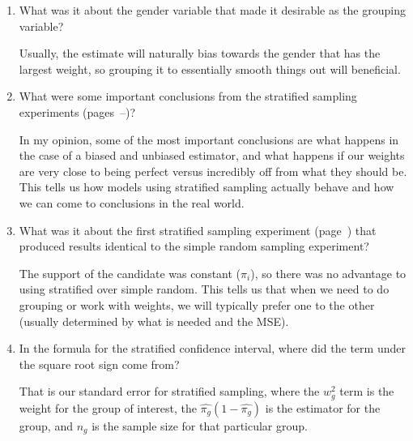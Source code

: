 \begin{enumerate}
 \item What was it about the gender variable that made it desirable as the grouping variable?
\begin{solution}
Usually, the estimate will naturally bias towards the gender that has the largest weight, so grouping it to essentially smooth things out will beneficial.
\end{solution}

 \item What were some important conclusions from the stratified sampling experiments (pages~\pageref{exp:polling399-srs}--\pageref{exp:polling399-st4})?
\begin{solution}
In my opinion, some of the most important conclusions are what happens in the case of a biased and unbiased estimator, and what happens if our weights are very close to being perfect versus incredibly off from what they should be. This tells us how models using stratified sampling actually behave and how we can come to conclusions in the real world.
\end{solution}

 \item What was it about the first stratified sampling experiment (page~\pageref{exp:polling399-srs}) that produced results identical to the simple random sampling experiment?
\begin{solution}
The support of the candidate was constant ($\pi_{i}$), so there was no advantage to using stratified over simple random. This tells us that when we need to do grouping or work with weights, we will typically prefer one to the other (usually determined by what is needed and the MSE).
\end{solution}

 \item In the formula for the stratified confidence interval, where did the term under the square root sign come from?
\begin{solution}
That is our standard error for stratified sampling, where the $w_{g}^{2}$ term is the weight for the group of interest, the $\hat{\pi_{g}} (1 - \hat{\pi_{g}})$ is the estimator for the group, and $n_{g}$ is the sample size for that particular group. 
\end{solution}

\end{enumerate}




